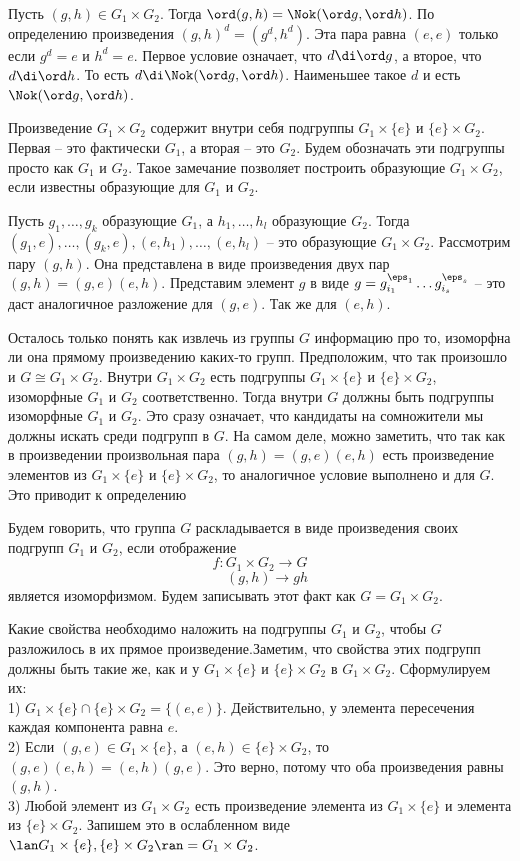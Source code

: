 \utv Пусть $(g,h)\in G_1\times G_2$. Тогда $\ord (g,h)= \Nok(\ord g, \ord h)$.
\eutv
\proof По определению произведения $(g,h)^d=(g^d,h^d)$. Эта пара равна $(e,e)$ только если $g^d=e$ и $h^d=e$. Первое условие означает, что $d\di \ord g$, а второе, что $d\di \ord h$. То есть $d\di \Nok(\ord g, \ord h)$. Наименьшее такое $d$ и есть $\Nok(\ord g, \ord h)$.
\endproof

Произведение $G_1\times G_2$ содержит внутри себя подгруппы $G_1\times \{e\}$  и $\{e\}\times G_2$. Первая -- это фактически $G_1$, а вторая -- это $G_2$. Будем обозначать эти подгруппы просто как $G_1$ и $G_2$. Такое замечание позволяет построить образующие $G_1\times G_2$, если известны образующие для $G_1$ и $G_2$.

\thrm Пусть $g_1,\dots,g_k$ образующие $G_1$, а $h_1,\dots,h_l$ образующие $G_2$. Тогда $(g_1,e), \dots, (g_k,e), (e,h_1),\dots,(e,h_l)$ -- это образующие $G_1\times G_2$.
\ethrm
\proof Рассмотрим пару $(g,h)$. Она представлена в виде произведения двух пар $(g,h)=(g,e)(e,h)$. Представим элемент $g$ в виде $g=g_{i_1}^{\eps_1}\dots g_{i_s}^{\eps_s}$ -- это даст аналогичное разложение для $(g,e)$. Так же для $(e,h)$.
\endproof

Осталось только понять как извлечь из группы $G$ информацию про то, изоморфна ли она прямому произведению каких-то групп. Предположим, что так произошло и $G\cong G_1\times G_2$. Внутри $G_1\times G_2$ есть подгруппы $G_1\times \{e\}$ и $\{e\}\times G_2$, изоморфные $G_1$ и $G_2$ соответственно. Тогда внутри $G$ должны быть подгруппы изоморфные $G_1$ и $G_2$. Это сразу означает, что кандидаты на сомножители мы должны искать среди подгрупп в $G$. На самом деле, можно заметить, что так как в произведении произвольная пара $(g,h)=(g,e)(e,h)$ есть произведение элементов из $G_1\times \{e\}$ и $\{e\}\times G_2$, то аналогичное условие выполнено и для $G$. Это приводит к определению

\dfn Будем говорить, что группа $G$ раскладывается в виде произведения своих подгрупп $G_1$ и $G_2$, если отображение
$$f\colon G_1\times G_2 \to G$$
$$\quad (g,h)\to gh$$
является изоморфизмом. Будем записывать этот факт как $G=G_1\times G_2$.
\edfn

Какие свойства необходимо наложить на подгруппы $G_1$ и $G_2$, чтобы $G$ разложилось в их прямое произведение.Заметим, что свойства этих подгрупп должны быть такие же, как и у $G_1\times \{e\}$ и $\{e\}\times G_2$ в $G_1\times G_2$. Сформулируем их:\\
1) $G_1\times \{e\} \cap \{e\}\times G_2 =\{(e,e)\}$. Действительно, у элемента пересечения каждая компонента равна $e$.\\
2) Если $(g,e)\in G_1\times \{e\}$, а $(e,h)\in \{e\}\times G_2$, то $(g,e)(e,h)=(e,h)(g,e)$. Это верно, потому что оба произведения равны $(g,h)$.\\
3) Любой элемент из $G_1\times G_2$ есть произведение элемента из $G_1\times \{e\}$  и элемента из $\{e\}\times G_2$. Запишем это в ослабленном виде $\lan G_1\times \{e\},\{e\}\times G_2\ran = G_1\times G_2$.\\

